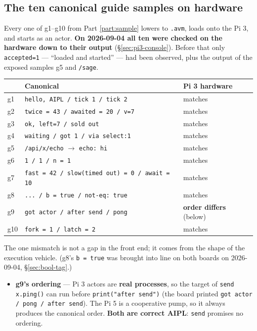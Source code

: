 \documentclass[11pt,a4paper]{article}
\begin{document}
\subsection{The ten canonical guide samples on hardware}

Every one of g1--g10 from Part \ref{part:sample} lowers to \texttt{.avm}, loads
onto the Pi 3, and starts as an actor.
\textbf{On 2026-09-04 all ten were checked on the hardware down to their output}
(\S\ref{sec:pi3-console}). Before that only \texttt{accepted=1} --- ``loaded and
started'' --- had been observed, plus the output of the exposed samples g5 and
\texttt{/sage}.

\begin{center}
\small
\begin{tabular}{@{}lll@{}}
\toprule
 & Canonical & Pi 3 hardware \\
\midrule
g1  & \texttt{hello, AIPL / tick 1 / tick 2} & matches \\
g2  & \texttt{twice = 43 / awaited = 20 / v=7} & matches \\
g3  & \texttt{ok, left=7 / sold out} & matches \\
g4  & \texttt{waiting / got 1 / via select:1} & matches \\
g5  & \texttt{/api/x/echo} $\to$ \texttt{echo: hi} & matches \\
g6  & \texttt{1 / 1 / n = 1} & matches \\
g7  & \texttt{fast = 42 / slow(timed out) = 0 / await = 10} & matches \\
g8  & \texttt{... / b = true / not-eq: true} & matches \\
g9  & \texttt{got actor / after send / pong} & \textbf{order differs} (below) \\
g10 & \texttt{fork = 1 / latch = 2} & matches \\
\bottomrule
\end{tabular}
\end{center}

The one mismatch is not a gap in the front end; it comes from the shape of the
execution vehicle. (g8's \texttt{b = true} was brought into line on both boards on
2026-09-04, \S\ref{sec:bool-tag}.)

\begin{itemize}
\item \textbf{g9's ordering} --- Pi 3 actors are \textbf{real processes}, so the
  target of \texttt{send x.ping()} can run before \texttt{print("after send")}
  (the board printed \texttt{got actor / pong / after send}).
  The Pi 5 is a cooperative pump, so it always produces the canonical order.
  \textbf{Both are correct AIPL}: \texttt{send} promises no ordering.
\end{itemize}
\end{document}
